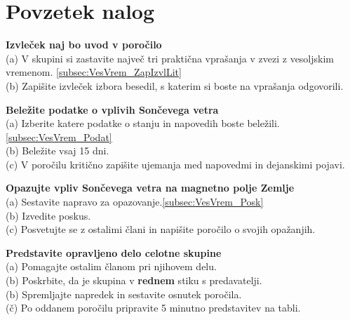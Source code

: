 %
%
\section*{Povzetek nalog}
%
\begin{prob}
\label{Nal:VesVrem_Izvl}
\textbf{Izvleček naj bo uvod v poročilo}\\
(a) V skupini si zastavite največ tri praktična vprašanja v zvezi z vesoljskim vremenom. \ref{subsec:VesVrem_ZapIzvlLit} \\
(b) Zapišite izvleček izbora besedil, s katerim si boste na vprašanja odgovorili.
\end{prob}

\begin{prob}
\label{Nal:VesVrem_Belez}
\textbf{Beležite podatke o vplivih Sončevega vetra}\\
(a) Izberite katere podatke o stanju in napovedih boste beležili. \ref{subsec:VesVrem_Podat}\\
(b) Beležite vsaj 15 dni. \\
(c) V poročilu kritično zapišite ujemanja med napovedmi in dejanskimi pojavi.
\end{prob}

\begin{prob}
	\label{Nal:VesVrem_Eksp}
	\textbf{Opazujte vpliv Sončevega vetra na magnetno polje Zemlje}\\
	(a) Sestavite napravo za opazovanje.\ref{subsec:VesVrem_Posk} \\
	(b) Izvedite poskus. \\
	(c) Posvetujte se z ostalimi člani in napišite poročilo o svojih opažanjih.
\end{prob}


\begin{prob}
\label{Nal:VesVrem_Predst}
\textbf{Predstavite opravljeno delo celotne skupine}\\
(a) Pomagajte ostalim članom pri njihovem delu. \\
(b) Poskrbite, da je skupina v \textbf{rednem} stiku s predavatelji.\\
(b) Spremljajte napredek in sestavite osnutek poročila. \\
(č) Po oddanem poročilu pripravite 5 minutno predstavitev na tabli.
\end{prob}

%
